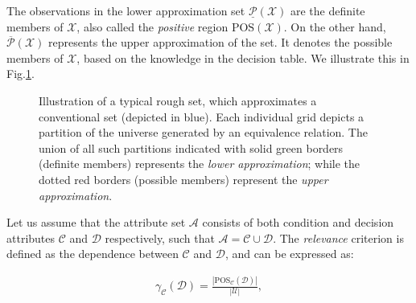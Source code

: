 The observations in the lower approximation set $\underline{\mathcal{P}}(\mathcal{X})$ are the definite members of $\mathcal{X}$, also called the \emph{positive} region $\mbox{POS}(\mathcal{X})$. On the other hand, $\overline{\mathcal{P}}(\mathcal{X})$ represents the upper approximation of the set. It denotes the possible members of $\mathcal{X}$, based on the knowledge in the decision table. 
We illustrate this in Fig.\ref{fig:rs-illus}.

\begin{figure}[htbp]
\centering
{}
\caption[Pictoral illustration of different rough-set terminology.]{Illustration of a typical rough set, which approximates a conventional set (depicted in blue). Each individual grid depicts a partition of the universe generated by an equivalence relation. The union of all such partitions indicated with solid green borders (definite members) represents the \emph{lower approximation}; while the dotted red borders (possible members) represent the \emph{upper approximation}.}
\label{fig:rs-illus}
\end{figure}

Let us assume that the attribute set $\mathcal{A}$ consists of both condition and decision attributes $\mathcal{C}$ and $\mathcal{D}$ respectively, such that $\mathcal{A} = \mathcal{C} \cup \mathcal{D}$. The \emph{relevance} criterion is defined as the dependence between $\mathcal{C}$ and $\mathcal{D}$, and can be expressed as:

\begin{align}
\label{eq:rel-defn}
\gamma_\mathcal{C}(\mathcal{D}) = \frac{|\mbox{POS}_\mathcal{C}(\mathcal{D})|}{|\mathcal{U}|},
\end{align}

